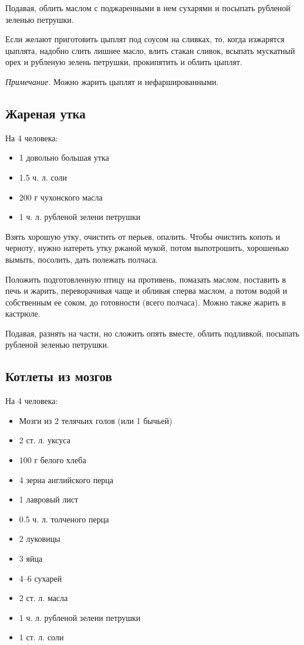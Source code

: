 Подавая, облить маслом с поджаренными в нем сухарями и посыпать рубленой зеленью петрушки.

Если желают приготовить цыплят под соусом на сливках, то, когда изжарятся цыплята, надобно слить лишнее масло, влить стакан сливок, всыпать мускатный орех и рубленую зелень петрушки, прокипятить и облить цыплят.

\emph{Примечание.} Можно жарить цыплят и нефаршированными.

\subsection{Жареная утка}
На 4 человека:
\begin{itemize}
	\item 1 довольно большая утка
	\item 1.5 ч. л. соли
    \item 200 г чухонского масла 
    \item 1 ч. л. рубленой зелени петрушки
\end{itemize}

Взять хорошую утку, очистить от перьев, опалить. Чтобы очистить копоть и черноту, нужно натереть утку ржаной мукой, потом выпотрошить, хорошенько вымыть, посолить, дать полежать полчаса.

Положить подготовленную птицу на противень, помазать маслом, поставить в печь и жарить, переворачивая чаще и обливая сперва маслом, а потом водой и собственным ее соком, до готовности (всего полчаса). Можно также жарить в кастрюле.

Подавая, разнять на части, но сложить опять вместе, облить подливкой, посыпать рубленой зеленью петрушки.

\subsection{Котлеты из мозгов}

На 4 человека: 
\begin{itemize}
	\item Мозги из 2 телячьих голов (или 1 бычьей) 
    \item 2 ст. л. уксуса 
    \item 100 г белого хлеба 
    \item 4 зерна английского перца 
    \item 1 лавровый лист 
    \item 0.5 ч. л. толченого перца 
    \item 2 луковицы 
    \item 3 яйца 
    \item 4–6 сухарей 
    \item 2 ст. л. масла
    \item 1 ч. л. рубленой зелени петрушки 
    \item 1 ст. л. соли
\end{itemize}

